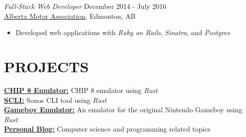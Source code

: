 \documentclass[margin, 10pt]{res} %
\begin{document}
\begin{resume}
{\sl Full-Stack Web Developer} \hfill December 2014 - July 2016 \\
\href{https://ama.ab.ca/}{Alberta Motor Association}, Edmonton, AB
\begin{itemize} 
    \item Developed web applications with {\it Ruby on Rails}, {\it Sinatra}, and {\it Postgres}
\end{itemize}



\section{PROJECTS}
\href{https://github.com/adamrmelnyk/chip_8_emulator}{\bf CHIP 8 Emulator:} CHIP 8 emulator using {\it Rust} \\
\href{https://github.com/adamrmelnyk/scli}{\bf SCLI:} Sonos CLI tool using {\it Rust} \\
\href{https://github.com/adamrmelnyk/oxide\_boy}{\bf Gameboy Emulator:} An emulator for the original Nintendo Gameboy using {\it Rust} \\
\href{https://arm64.ca}{\bf Personal Blog:} Computer science and programming related topics \\

\end{resume}
\end{document}
